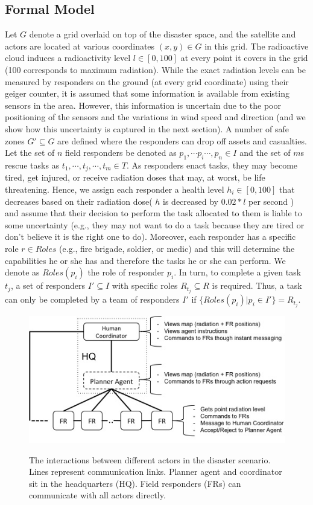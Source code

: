 \subsection{Formal Model}
\noindent Let $G$ denote a grid overlaid on top of the disaster space, and the satellite and actors are located at various coordinates $(x,y) \in G$ in this grid. The radioactive cloud induces a radioactivity level  $l \in [0,100]$ at every point it covers in the grid (100 corresponds to maximum radiation). While the exact radiation levels can be measured by responders on the ground (at every grid coordinate) using their geiger counter, it is assumed that some information is available  from existing sensors  in the area. However, this information is uncertain due to the poor positioning of the sensors and the variations in wind speed and direction (and we show how this uncertainty is captured in the next section). A number of safe zones $G' \subseteq G$ are defined where the responders can drop off assets and casualties. Let the set of $n$ field responders be denoted as $p_1, \cdots p_i \cdots, p_n \in I$ and the set of $m$s rescue tasks as  $t_1,\cdots, t_j, \cdots, t_m\in T$.  As responders enact tasks, they may become tired, get injured, or receive radiation doses that may, at worst, be life threatening. Hence, we assign each responder  a health level $h_i\in [0,100]$ that decreases based on their radiation dose( $h$ is decreased by $0.02 * l $ per second ) and assume that their decision to perform the task allocated to them is liable to some uncertainty (e.g., they may not want to do a task because they are tired or don't believe it is the right one to do).  Moreover, each responder has  a specific role  $r \in Roles$ (e.g., fire brigade, soldier, or medic) and this will determine the capabilities he or she has and therefore the tasks he or she can perform. We denote as $Roles(p_i)$ the role of responder $p_i$. In turn, to complete a given task $t_j$,  a set of responders $I' \subseteq I$ with specific roles $R_{t_j} \subseteq R$ is required. Thus, a task can only be completed by a team of responders $I'$ if $\{Roles(p_i) | p_i \in I'\} = R_{t_j}$. 
\begin{figure}[htbp]
\includegraphics[width=\columnwidth]{scenario.jpg}
\label{fig:scenario}
\caption{The interactions between different actors in the disaster scenario. Lines represent communication links. Planner agent and coordinator sit in the headquarters (HQ). Field responders (FRs) can communicate with all actors directly.}
\end{figure}
